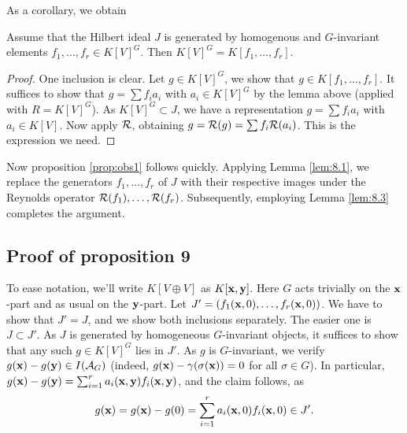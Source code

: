 \documentclass[../main.tex]{subfiles}
\begin{document}
As a corollary, we obtain
\begin{lem}\label{lem:8.3}
    Assume that the Hilbert ideal $J$ is generated by homogenous and
    $G$-invariant elements $f_1, \dots, \allowbreak f_r \in K[V]^G$. Then
    $K[V]^G = K[f_1, \dots, f_r]$. 
\begin{proof}
    One inclusion is clear. Let $g \in K[V]^G$, we show that $g \in K[f_1, \dots, f_r]$.
    It suffices to show that $g = \sum f_i a_i$ with $a_i \in K[V]^G$
    by the lemma above (applied with $R = K[V]^G$). As $K[V]^G \subset J$, we
    have a representation $g = \sum f_i a_i$ with $a_i \in K[V]$. Now apply
    $\mathcal{R}$, obtaining $g = \mathcal{R}(g) = \sum f_i \mathcal{R}(a_i)$. This is the expression
    we need.
\end{proof}
\end{lem}

Now proposition \ref{prop:obs1} follows quickly. 
Applying Lemma \ref{lem:8.1}, we replace the generators $f_1, \dots, f_r$ of
$J$ with their respective images under the Reynolds operator $\mathcal{R}(f_1), \dots,
\mathcal{R}(f_r)$. Subsequently, employing Lemma \ref{lem:8.3} completes the argument.

\subsection{Proof of proposition 9} %
\label{sub:Proof of proposition 9}
To ease notation, we'll write $K[V \oplus V]$ as $K[\mathbf{x},\mathbf{y}]$. Here $G$ acts trivially
on the $\mathbf{x}$-part and as usual on the $\mathbf{y}$-part.
Let $J' = (f_1(\mathbf{x}, 0), \dots, f_r(\mathbf{x},0))$. We have to show that $J' = J$, and
we show both inclusions separately. The easier one is $J \subset J'$. 
As $J$ is generated by homogeneous $G$-invariant objects, it suffices to show that any
such $g \in K[V]^G$ lies in $J'$. As $g$ is $G$-invariant, we verify $g(\mathbf{x})-g(\mathbf{y}) \in
I(\mathcal{A}_G)$ (indeed, $g(\mathbf{x})-\gamma(\sigma(\mathbf{x})) = 0$ for all $\sigma \in G$). In particular, $g(\mathbf{x}) - g(\mathbf{y}) = \sum_{i=1}^r a_i(\mathbf{x},\mathbf{y}) f_i(\mathbf{x},\mathbf{y})$,
and the claim follows, as
\begin{equation*}
    g(\mathbf{x}) = g(\mathbf{x}) - g(0) = \sum_{i=1}^r a_i(\mathbf{x},0) f_i(\mathbf{x},0) \in J'.
\end{equation*}
\end{document}
